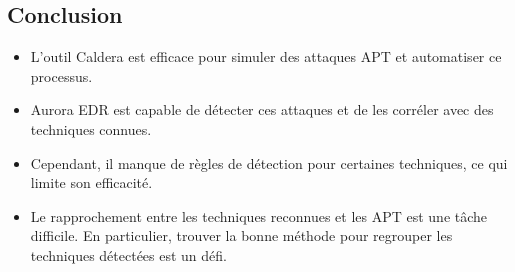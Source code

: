 \documentclass[12pt,a4paper]{article}
\begin{document}
\subsection*{Conclusion}
\begin{itemize}
    \item L'outil Caldera est efficace pour simuler des attaques APT et automatiser ce processus.
    \item Aurora EDR est capable de détecter ces attaques et de les corréler avec des techniques connues.
    \item Cependant, il manque de règles de détection pour certaines techniques, ce qui limite son efficacité.
    \item Le rapprochement entre les techniques reconnues et les APT est une tâche difficile. En particulier, trouver la bonne méthode pour regrouper les techniques détectées est un défi.
\end{itemize}
\end{document}
